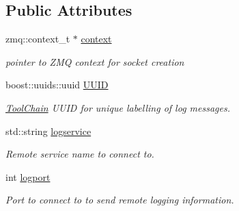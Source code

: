 \subsection*{Public Attributes}
\begin{DoxyCompactItemize}
\item 
\hypertarget{structLogging__thread__args_a620caaa44aa5611507b635740a34d752}{zmq\-::context\-\_\-t $\ast$ \hyperlink{structLogging__thread__args_a620caaa44aa5611507b635740a34d752}{context}}\label{structLogging__thread__args_a620caaa44aa5611507b635740a34d752}

\begin{DoxyCompactList}\small\item\em pointer to Z\-M\-Q context for socket creation \end{DoxyCompactList}\item 
\hypertarget{structLogging__thread__args_a3a7c5617b7fa5214c6da407a23266d57}{boost\-::uuids\-::uuid \hyperlink{structLogging__thread__args_a3a7c5617b7fa5214c6da407a23266d57}{U\-U\-I\-D}}\label{structLogging__thread__args_a3a7c5617b7fa5214c6da407a23266d57}

\begin{DoxyCompactList}\small\item\em \hyperlink{classToolChain}{Tool\-Chain} U\-U\-I\-D for unique labelling of log messages. \end{DoxyCompactList}\item 
\hypertarget{structLogging__thread__args_a5a8e255209f5c171a7fbd78f0e308087}{std\-::string \hyperlink{structLogging__thread__args_a5a8e255209f5c171a7fbd78f0e308087}{logservice}}\label{structLogging__thread__args_a5a8e255209f5c171a7fbd78f0e308087}

\begin{DoxyCompactList}\small\item\em Remote service name to connect to. \end{DoxyCompactList}\item 
\hypertarget{structLogging__thread__args_ad5ab1c21e226a694c7f813bcb3ef9002}{int \hyperlink{structLogging__thread__args_ad5ab1c21e226a694c7f813bcb3ef9002}{logport}}\label{structLogging__thread__args_ad5ab1c21e226a694c7f813bcb3ef9002}

\begin{DoxyCompactList}\small\item\em Port to connect to to send remote logging information. \end{DoxyCompactList}\end{DoxyCompactItemize}



